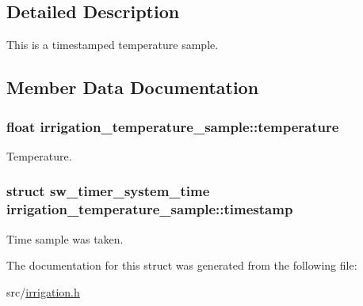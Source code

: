 \subsection{Detailed Description}
This is a timestamped temperature sample. 

\subsection{Member Data Documentation}
\hypertarget{structirrigation__temperature__sample_ae72c8bc3c16a24366685eecbf9493a2e}{}
\subsubsection[{temperature}]{\setlength{\rightskip}{0pt plus 5cm}float irrigation\+\_\+temperature\+\_\+sample\+::temperature}\label{structirrigation__temperature__sample_ae72c8bc3c16a24366685eecbf9493a2e}


Temperature. 

\hypertarget{structirrigation__temperature__sample_aa10fbbf9f10f89fc9f246f42c26b0ad2}{}
\subsubsection[{timestamp}]{\setlength{\rightskip}{0pt plus 5cm}struct {\bf sw\+\_\+timer\+\_\+system\+\_\+time} irrigation\+\_\+temperature\+\_\+sample\+::timestamp}\label{structirrigation__temperature__sample_aa10fbbf9f10f89fc9f246f42c26b0ad2}


Time sample was taken. 



The documentation for this struct was generated from the following file\+:\begin{DoxyCompactItemize}
\item 
src/\hyperlink{irrigation_8h}{irrigation.\+h}\end{DoxyCompactItemize}
